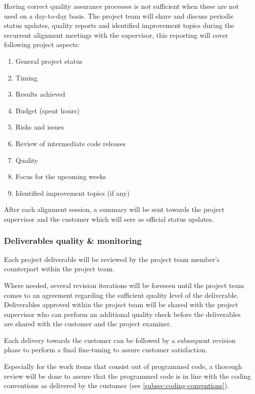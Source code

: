 Having correct quality assurance processes is not sufficient when these are not used on a day-to-day basis.
The project team will share and discuss periodic status updates, quality reports and identified improvement topics during the recurrent alignment meetings with the supervisor, this reporting will cover following project aspects:

\begin{enumerate}
	\item General project status
	\item Timing
	\item Results achieved
	\item Budget (spent hours)
	\item Risks and issues
	\item Review of intermediate code releases
	\item Quality
	\item Focus for the upcoming weeks
	\item Identified improvement topics (if any)
\end {enumerate}

After each alignment session, a summary will be sent towards the project supervisor and the customer which will sere as official status updates.

\subsubsection{Deliverables quality \& monitoring}
Each project deliverable will be reviewed by the project team member's counterpart within the project team.

Where needed, several revision iterations will be foreseen until the project team comes to an agreement regarding the sufficient quality level of the deliverable.
Deliverables approved within the project team will be shared with the project supervisor who can perform an additional quality check before the deliverables are shared with the customer and the project examiner.

Each delivery towards the customer can be followed by a subsequent revision phase to perform a final fine-tuning to assure customer satisfaction.

Especially for the work items that consist out of programmed code, a thorough review will be done to assure that the programmed code is in line with the coding conventions as delivered by the customer (see \autoref{subsec:coding-conventions}).
